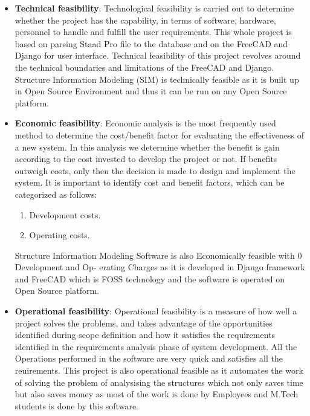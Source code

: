 \begin{itemize}
\item \textbf{Technical feasibility}: Technological feasibility is carried out to determine whether the
project has the capability, in terms of software, hardware, personnel to handle and fulfill the
user requirements. This whole project is based on parsing Staad Pro file to the database and 
on the FreeCAD and Django for user interface. Technical feasibility of this project revolves around
the technical boundaries and limitations of the FreeCAD and Django. Structure Information Modeling (SIM) is technically feasible as it is built up in Open Source
Environment and thus it can be run on any Open Source platform. 

\item \textbf{Economic feasibility}: Economic analysis is the most frequently used method to determine
the cost/benefit factor for evaluating the effectiveness of a new system. In this analysis we
determine whether the benefit is gain according to the cost invested to develop the project
or not. If benefits outweigh costs, only then the decision is made to design and implement
the system. It is important to identify cost and benefit factors, which can be categorized as
follows:

\begin{enumerate}
\item Development costs.
\item Operating costs.
\end{enumerate}

Structure Information Modeling Software is also Economically feasible with 0 Development and Op-
erating Charges as it is developed in Django framework and FreeCAD which is
FOSS technology and the software is operated on Open Source platform.

\item \textbf{Operational feasibility}: Operational feasibility is a measure of how well a project solves
the problems, and takes advantage of the opportunities identified during scope definition
and how it satisfies the requirements identified in the requirements analysis phase of system
development. All the Operations performed in the software are very quick and satisfies all
the reuirements. This project is also operational feasible as it automates the work of solving
the problem of analysising the structures which not only saves time but also saves money as
most of the work is done by Employees and M.Tech students is done by this software.


\end{itemize}
